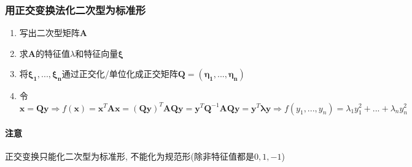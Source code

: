\subsubsection{用正交变换法化二次型为标准形}
\begin{enumerate}\label{ref:求标准形}
\item 写出二次型矩阵$ \bm{A} $
\item 求$ \bm{A} $的特征值$ \lambda $和特征向量$ \bm{\xi} $
\item 将$ \bm{\xi_{1}},..., \bm{\xi_{n}} $通过正交化/单位化成正交矩阵$ \bm{Q}=(\bm{\eta_{1}},..., \bm{\eta_{n}}) $
\item 令$ \bm{x}=\bm{Q}\bm{y}\Rightarrow f(\bm{x})=\bm{x}^{T}\bm{A}\bm{x}=(\bm{Q}\bm{y})^{T}\bm{A}\bm{Q}\bm{y}=\bm{y}^{T}\bm{Q}^{-1}\bm{A}\bm{Q}\bm{y}=\bm{y}^{T}\bm{\lambda}\bm{y}\Rightarrow f(y_{1},..., y_{n})=\lambda_{1}y_{1}^{2}+... +\lambda_{n}y_{n}^{2} $ 
\end{enumerate}
\paragraph{注意} 正交变换只能化二次型为标准形, 不能化为规范形(除非特征值都是$ 0, 1, -1 $)\par
